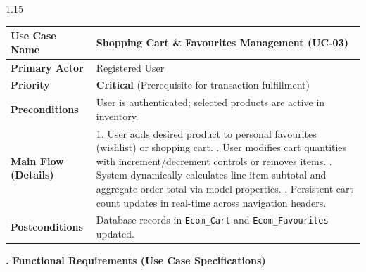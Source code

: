 \documentclass[12pt,a4paper]{article}
\begin{document}
{\begin{spacing}{1.15}
\begin{center}
\renewcommand{\arraystretch}{1.2}
\fontsize{10.5}{14}\selectfont
\begin{tabular}{|p{1.6in}|p{4.9in}|}
\hline
\textbf{Use Case Name} & Shopping Cart \& Favourites Management (\textbf{UC-03}) \\ \hline
\textbf{Primary Actor} & Registered User \\ \hline
\textbf{Priority} & \textbf{Critical} (Prerequisite for transaction fulfillment) \\ \hline
\textbf{Preconditions} & User is authenticated; selected products are active in inventory. \\ \hline
\textbf{Main Flow (Details)} &
1. User adds desired product to personal favourites (wishlist) or shopping cart. \newline
2. User modifies cart quantities with increment/decrement controls or removes items. \newline
3. System dynamically calculates line-item subtotal and aggregate order total via model properties. \newline
4. Persistent cart count updates in real-time across navigation headers. \\ \hline
\textbf{Postconditions} & Database records in \texttt{Ecom\_Cart} and \texttt{Ecom\_Favourites} updated. \\ \hline
\end{tabular}
\end{center}

\end{spacing}
}

\vfill

\newpage



\noindent
{\color{bcetblue}\textbf{\fontsize{14}{18}. Functional Requirements (Use Case Specifications)}}

\vspace{0.10in}
\end{document}
